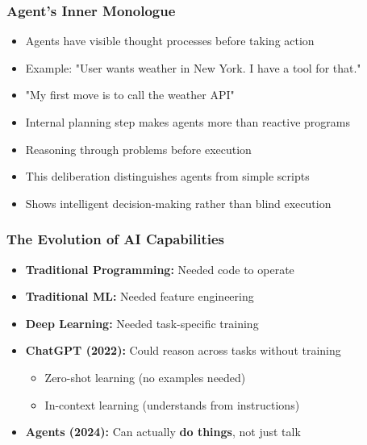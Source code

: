 \begin{frame}[fragile]\frametitle{Agent's Inner Monologue}
      \begin{itemize}
        \item Agents have visible thought processes before taking action
        \item Example: "User wants weather in New York. I have a tool for that."
        \item "My first move is to call the weather API"
        \item Internal planning step makes agents more than reactive programs
        \item Reasoning through problems before execution
        \item This deliberation distinguishes agents from simple scripts
        \item Shows intelligent decision-making rather than blind execution
      \end{itemize}
\end{frame}


\begin{frame}[fragile]\frametitle{The Evolution of AI Capabilities}
\begin{itemize}
    \item \textbf{Traditional Programming:} Needed code to operate
    \item \textbf{Traditional ML:} Needed feature engineering
    \item \textbf{Deep Learning:} Needed task-specific training
    \item \textbf{ChatGPT (2022):} Could reason across tasks without training
    \begin{itemize}
        \item Zero-shot learning (no examples needed)
        \item In-context learning (understands from instructions)
    \end{itemize}
    \item \textbf{Agents (2024):} Can actually \textbf{do things}, not just talk
\end{itemize}
\end{frame}


